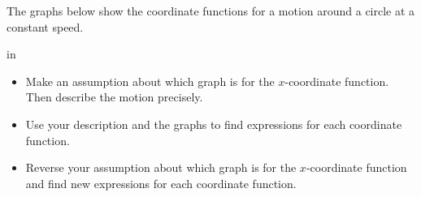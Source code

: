 \documentclass{ximera}
\newcommand{\pskip}{\vskip 0.1 in}
\begin{document}
\begin{example} \label{Ex2:Graphs}
The graphs below show the coordinate functions for a motion around a circle at a constant speed. 

\pskip

\begin{itemize}
\item{Make an assumption about which graph is for the $x$-coordinate function. Then describe the motion precisely.}

\item{Use your description and the graphs to find expressions for each coordinate function.}

\item{Reverse  your assumption about which graph is for the $x$-coordinate function and find new expressions for each coordinate function.}
\end{itemize}

\begin{exploration}
 
\begin{onlineOnly}
    \begin{center}
\end{center}
\end{onlineOnly}
\end{exploration}

\end{example}
\end{document}
